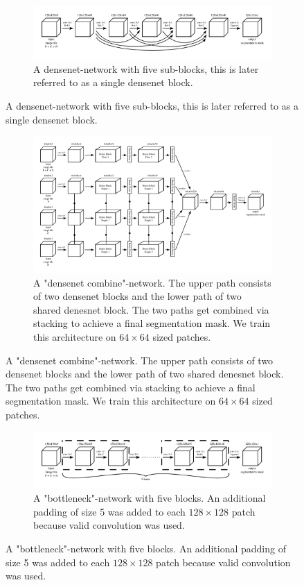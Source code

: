 	\begin{figure}[H]
  \ContinuedFloat
  \centering
		\begin{subfigure}{.95\textwidth}
		\centering
		\includegraphics[width=\linewidth]{models_flow/densenet.png}
	\caption[figure]{A densenet-network with five sub-blocks, this is later referred to as a single densenet block.}
	\label{fig:flow_densenet}
	\end{subfigure}
\end{figure}
\begin{figure}[H]
  \ContinuedFloat
  \centering
			\begin{subfigure}{.95\textwidth}
		\centering
		\includegraphics[width=\linewidth]{models_flow/densenet_comb.png}
	\caption[figure]{A "densenet combine"-network. The upper path consists of two densenet blocks and the lower path of two shared denesnet block. The two paths get combined via stacking to achieve a final segmentation mask. We train this architecture on $64\times64$ sized patches.}
	\label{fig:flow_densenet_comb}
	\end{subfigure}
\end{figure}
\begin{figure}[H]
  \ContinuedFloat
  \centering
			\begin{subfigure}{.95\textwidth}
		\centering
		\includegraphics[width=\linewidth]{models_flow/bottleneck.png}
	\caption[figure]{A "bottleneck"-network with five blocks. An additional padding of size 5 was added to each $128\times128$ patch because valid convolution was used.}
	\label{fig:flow_bottleneck}
	\end{subfigure}
		\end{figure}
